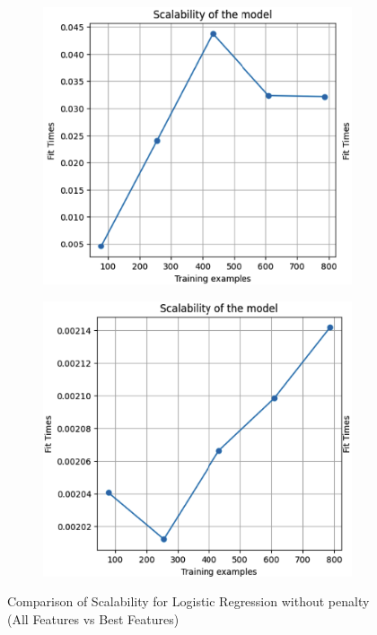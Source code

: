 \documentclass[conference]{IEEEtran}
\begin{document}
\begin{figure}[htbp]
    \centering
    \begin{subfigure}[b]{0.45\linewidth}
        \centering
        \includegraphics[width=\linewidth]{images/ScalabilityNoPenaltyAllFeatures.png}
        \label{fig:scalability-all}
    \end{subfigure}
    \hfill
    \begin{subfigure}[b]{0.45\linewidth}
        \centering
        \includegraphics[width=\linewidth]{images/ScalabilityNoPenaltyBestFeatures.png}
        \label{fig:scalability-best}
    \end{subfigure}
    \caption{Comparison of Scalability for Logistic Regression without penalty (All Features vs Best Features)}
    \label{fig:scalability-comparison}
\end{figure}
\end{document}
